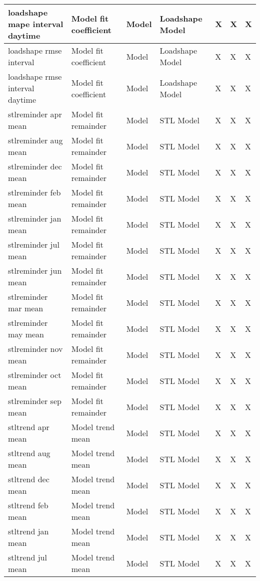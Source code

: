 {{\begin{longtable}[l]{ | p{4cm} | p{4cm} | p{1cm} | p{2cm} | p{0.3cm} | p{0.3cm} | p{0.3cm} |}
	 loadshape mape interval daytime & Model fit coefficient & Model & Loadshape Model & X & X & X \\ \hline
	 loadshape rmse interval & Model fit coefficient & Model & Loadshape Model & X & X & X \\ \hline
	 loadshape rmse interval daytime & Model fit coefficient & Model & Loadshape Model & X & X & X \\ \hline
	 stlreminder apr mean & Model fit remainder & Model & STL Model & X & X & X \\ \hline
	 stlreminder aug mean & Model fit remainder & Model & STL Model & X & X & X \\ \hline
	 stlreminder dec mean & Model fit remainder & Model & STL Model & X & X & X \\ \hline
	 stlreminder feb mean & Model fit remainder & Model & STL Model & X & X & X \\ \hline
	 stlreminder jan mean & Model fit remainder & Model & STL Model & X & X & X \\ \hline
	 stlreminder jul mean & Model fit remainder & Model & STL Model & X & X & X \\ \hline
	 stlreminder jun mean & Model fit remainder & Model & STL Model & X & X & X \\ \hline
	 stlreminder mar mean & Model fit remainder & Model & STL Model & X & X & X \\ \hline
	 stlreminder may mean & Model fit remainder & Model & STL Model & X & X & X \\ \hline
	 stlreminder nov mean & Model fit remainder & Model & STL Model & X & X & X \\ \hline
	 stlreminder oct mean & Model fit remainder & Model & STL Model & X & X & X \\ \hline
	 stlreminder sep mean & Model fit remainder & Model & STL Model & X & X & X \\ \hline
	 stltrend apr mean & Model trend mean & Model & STL Model & X & X & X \\ \hline
	 stltrend aug mean & Model trend mean & Model & STL Model & X & X & X \\ \hline
	 stltrend dec mean & Model trend mean & Model & STL Model & X & X & X \\ \hline
	 stltrend feb mean & Model trend mean & Model & STL Model & X & X & X \\ \hline
	 stltrend jan mean & Model trend mean & Model & STL Model & X & X & X \\ \hline
	 stltrend jul mean & Model trend mean & Model & STL Model & X & X & X \\ \hline

\end{longtable}}}
